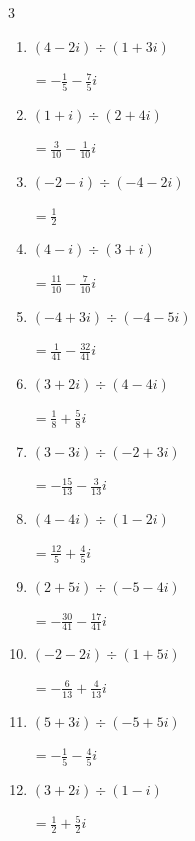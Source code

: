 \begin{multicols}{3}
\begin{enumerate}
  \item $\displaystyle (4-2i)\div(1+3i)$

        $\displaystyle =-\frac{1}{5}-\frac{7}{5}i$

  \item $\displaystyle (1+i)\div(2+4i)$

        $\displaystyle =\frac{3}{10}-\frac{1}{10}i$

  \item $\displaystyle (-2-i)\div(-4-2i)$

        $\displaystyle =\frac{1}{2}$

  \item $\displaystyle (4-i)\div(3+i)$

        $\displaystyle =\frac{11}{10}-\frac{7}{10}i$

  \item $\displaystyle (-4+3i)\div(-4-5i)$

        $\displaystyle =\frac{1}{41}-\frac{32}{41}i$

  \item $\displaystyle (3+2i)\div(4-4i)$

        $\displaystyle =\frac{1}{8}+\frac{5}{8}i$

  \item $\displaystyle (3-3i)\div(-2+3i)$

        $\displaystyle =-\frac{15}{13}-\frac{3}{13}i$

  \item $\displaystyle (4-4i)\div(1-2i)$

        $\displaystyle =\frac{12}{5}+\frac{4}{5}i$

  \item $\displaystyle (2+5i)\div(-5-4i)$

        $\displaystyle =-\frac{30}{41}-\frac{17}{41}i$

\columnbreak %

  \item $\displaystyle (-2-2i)\div(1+5i)$

        $\displaystyle =-\frac{6}{13}+\frac{4}{13}i$

  \item $\displaystyle (5+3i)\div(-5+5i)$

        $\displaystyle =-\frac{1}{5}-\frac{4}{5}i$

  \item $\displaystyle (3+2i)\div(1-i)$

        $\displaystyle =\frac{1}{2}+\frac{5}{2}i$


\end{enumerate}
\end{multicols}
